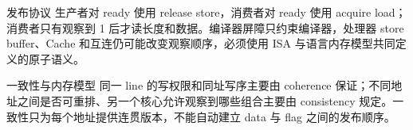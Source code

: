 \begin{chapteranswer}{发布协议}
生产者对 ready 使用 release store，消费者对 ready 使用 acquire load；消费者只有观察到 1 后才读长度和数据。编译器屏障只约束编译器，处理器 store buffer、Cache 和互连仍可能改变观察顺序，必须使用 ISA 与语言内存模型共同定义的原子语义。
\end{chapteranswer}

\begin{chapteranswer}{一致性与内存模型}
同一 line 的写权限和同址写序主要由 coherence 保证；不同地址之间是否可重排、另一个核心允许观察到哪些组合主要由 consistency 规定。一致性只为每个地址提供连贯版本，不能自动建立 data 与 flag 之间的发布顺序。
\end{chapteranswer}
